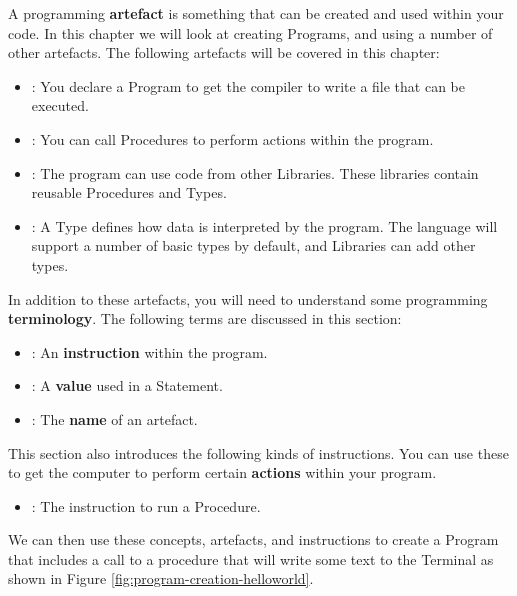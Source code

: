 A programming \textbf{artefact} is something that can be created and used within your code. In this chapter we will look at creating Programs, and using a number of other artefacts. The following artefacts will be covered in this chapter:
\begin{itemize}
  \item {}: You declare a Program to get the compiler to write a file that can be executed.
  \item {}: You can call Procedures to perform actions within the program.
  \item {}: The program can use code from other Libraries. These libraries contain reusable Procedures and Types. 
  \item {}: A Type defines how data is interpreted by the program. The language will support a number of basic types by default, and Libraries can add other types. 
\end{itemize}

In addition to these artefacts, you will need to understand some programming \textbf{terminology}. The following terms are discussed in this section:
\begin{itemize}
  \item {}: An \textbf{instruction} within the program.
  \item {}: A \textbf{value} used in a Statement.
  \item {}: The \textbf{name} of an artefact.
\end{itemize}

This section also introduces the following kinds of instructions. You can use these to get the computer to perform certain \textbf{actions} within your program.
\begin{itemize}
  \item {}: The instruction to run a Procedure.
\end{itemize}

We can then use these concepts, artefacts, and instructions to create a Program that includes a call to a procedure that will write some text to the Terminal as shown in Figure \ref{fig:program-creation-helloworld}.

